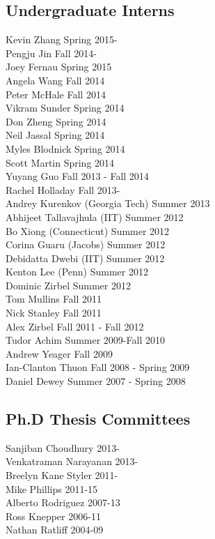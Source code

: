 \subsection{Undergraduate Interns}
\noindent
Kevin Zhang  \hfill Spring 2015-\\
Pengju Jin  \hfill Fall 2014-\\
Joey Fernau  \hfill Spring 2015\\
Angela Wang  \hfill Fall 2014\\
Peter McHale  \hfill Fall 2014\\
Vikram Sunder  \hfill Spring 2014\\
Don Zheng  \hfill Spring 2014\\
Neil Jassal  \hfill Spring 2014\\
Myles Blodnick  \hfill Spring 2014\\
Scott Martin  \hfill Spring 2014\\
Yuyang Guo  \hfill Fall 2013 - Fall 2014\\
Rachel Holladay  \hfill Fall 2013-\\
Andrey Kurenkov (Georgia Tech) \hfill Summer 2013\\ 
Abhijeet Tallavajhula (IIT) \hfill Summer 2012\\
Bo Xiong (Connecticut) \hfill Summer 2012\\
Corina Guaru (Jacobs) \hfill Summer 2012\\
Debidatta Dwebi (IIT) \hfill Summer 2012\\
Kenton Lee (Penn) \hfill Summer 2012\\
Dominic Zirbel  \hfill Summer 2012\\
Tom Mullins  \hfill Fall 2011\\
Nick Stanley  \hfill Fall 2011\\
Alex Zirbel  \hfill Fall 2011 - Fall 2012\\
Tudor Achim  \hfill Summer 2009-Fall 2010\\
Andrew Yeager  \hfill Fall 2009\\
Ian-Clanton Thuon  \hfill Fall 2008 - Spring 2009\\
Daniel Dewey  \hfill Summer 2007 - Spring 2008\\

\subsection{Ph.D Thesis Committees}
\noindent
Sanjiban Choudhury \hfill 2013-\\
Venkatraman Narayanan \hfill 2013-\\
Breelyn Kane Styler  \hfill 2011-\\ 
Mike Phillips  \hfill 2011-15\\
Alberto Rodriguez  \hfill 2007-13\\
Ross Knepper  \hfill 2006-11\\
Nathan Ratliff  \hfill 2004-09\\
